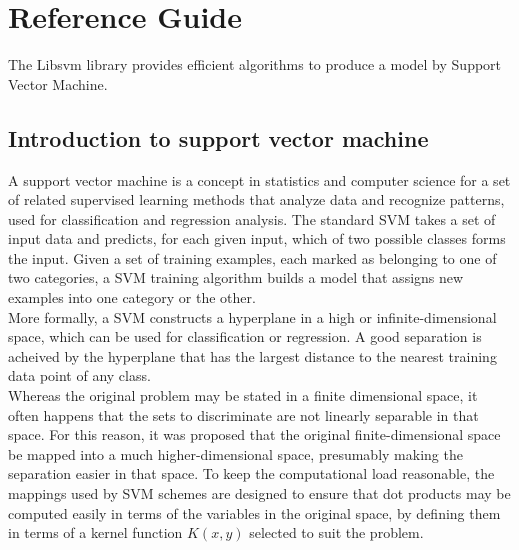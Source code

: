 % 




\section{Reference Guide}

The Libsvm library provides efficient algorithms to produce a model by Support Vector Machine.

\subsection{Introduction to support vector machine}

A support vector machine is a concept in statistics and computer science for a set of related supervised learning methods that analyze data and recognize patterns, used for classification and regression analysis. 
The standard SVM takes a set of input data and predicts, for each given input, which of two possible classes forms the input. Given a set of training examples, each marked as belonging to one of two categories, a SVM
training algorithm builds a model that assigns new examples into one category or the other.\\

More formally, a SVM constructs a hyperplane in a high or infinite-dimensional space, which can be used for classification or regression. A good separation is acheived by the hyperplane that 
has the largest distance to the nearest training data point of any class.\\

Whereas the original problem may be stated in a finite dimensional space, it often happens that the sets to discriminate are not linearly separable in that space. For this reason,
it was proposed that the original finite-dimensional space be mapped into a much higher-dimensional space, presumably making the separation easier in that space. To keep the computational load reasonable, the mappings used by SVM schemes are 
designed to ensure that dot products may be computed easily in terms of the variables in the original space, by defining them in terms of a kernel function $K(x,y)$ selected to suit the problem.

